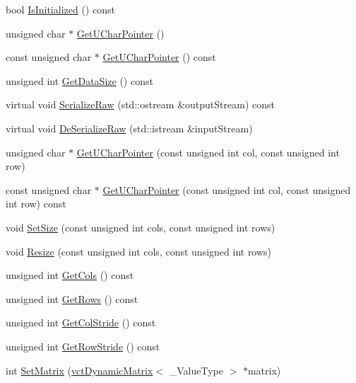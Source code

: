 \begin{DoxyCompactItemize}
bool \hyperlink{classsvl_sample_matrix_custom_ace04bc8913fa421ebf8180329a49b910}{Is\-Initialized} () const 
\item 
unsigned char $\ast$ \hyperlink{classsvl_sample_matrix_custom_aca62ad757577c504eed6c40e91b2c53e}{Get\-U\-Char\-Pointer} ()
\item 
const unsigned char $\ast$ \hyperlink{classsvl_sample_matrix_custom_af18255e854d6fd1bcf3f5741bf321300}{Get\-U\-Char\-Pointer} () const 
\item 
unsigned int \hyperlink{classsvl_sample_matrix_custom_a6d80633f000dbd7c61f3b71bd12959fb}{Get\-Data\-Size} () const 
\item 
virtual void \hyperlink{classsvl_sample_matrix_custom_a1f626841e5db3258f74b272f26f04757}{Serialize\-Raw} (std\-::ostream \&output\-Stream) const 
\item 
virtual void \hyperlink{classsvl_sample_matrix_custom_aeb99f06139dd9fe01a28ea7e0414fc92}{De\-Serialize\-Raw} (std\-::istream \&input\-Stream)
\item 
unsigned char $\ast$ \hyperlink{classsvl_sample_matrix_custom_a140b13a3ee4fee5771f8803bfcbeb046}{Get\-U\-Char\-Pointer} (const unsigned int col, const unsigned int row)
\item 
const unsigned char $\ast$ \hyperlink{classsvl_sample_matrix_custom_af9e5c528ad0927d1b72d874017e9b4d6}{Get\-U\-Char\-Pointer} (const unsigned int col, const unsigned int row) const 
\item 
void \hyperlink{classsvl_sample_matrix_custom_acbf8cbd00acde9dbd22434372d651225}{Set\-Size} (const unsigned int cols, const unsigned int rows)
\item 
void \hyperlink{classsvl_sample_matrix_custom_a485c9822109d0c2dc257fd03d73e2f59}{Resize} (const unsigned int cols, const unsigned int rows)
\item 
unsigned int \hyperlink{classsvl_sample_matrix_custom_ada65ca3cc61fbc4e688f7d485e4fa607}{Get\-Cols} () const 
\item 
unsigned int \hyperlink{classsvl_sample_matrix_custom_a95e6ed875150bdd72045a262736809cd}{Get\-Rows} () const 
\item 
unsigned int \hyperlink{classsvl_sample_matrix_custom_a82d216488b83a47d6e5020597036321d}{Get\-Col\-Stride} () const 
\item 
unsigned int \hyperlink{classsvl_sample_matrix_custom_af0ed63879128fed0d50c9ce14ab1eb6f}{Get\-Row\-Stride} () const 
\item 
int \hyperlink{classsvl_sample_matrix_custom_a8cb4ba39cc4dc0db843591711a096319}{Set\-Matrix} (\hyperlink{classvct_dynamic_matrix}{vct\-Dynamic\-Matrix}$<$ \-\_\-\-Value\-Type $>$ $\ast$matrix)

\end{DoxyCompactItemize}
